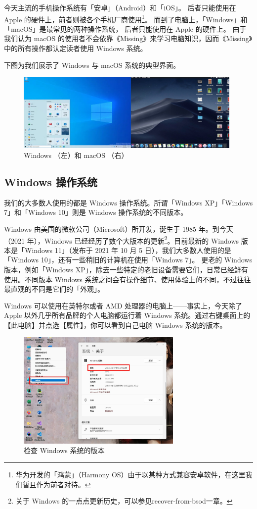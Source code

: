 今天主流的手机操作系统有「安卓」（Android）和「iOS」。
后者只能使用在 Apple 的硬件上，前者则被各个手机厂商使用\footnote{华为开发的「鸿蒙」（Harmony OS）由于以某种方式兼容安卓软件，在这里我们暂且作为前者对待。}。
而到了电脑上，「Windows」和「macOS」是最常见的两种操作系统，
后者只能使用在 Apple 的硬件上。
由于我们认为 macOS 的使用者不会依靠《Missing》来学习电脑知识，因而《Missing》中的所有操作都认定读者使用 Windows 系统。

下图为我们展示了 Windows 与 macOS 系统的典型界面。

\begin{figure}[htb!]
  \centering
  \includegraphics[width=11cm]{assets/Windows_and_macOS.jpg}
  \caption{Windows （左）和 macOS （右）}
  \label{win-and-mac}
\end{figure}

\subsection{Windows 操作系统}

我们的大多数人使用的都是 Windows 操作系统。所谓「Windows XP」「Windows 7」和「Windows 10」则是 Windows 操作系统的不同版本。

Windows 由美国的微软公司（Microsoft）所开发，诞生于 1985 年。到今天（2021 年），Windows 已经经历了数个大版本的更新\footnote{关于 Windows 的一点点更新历史，可以参见\refname{recover-from-bsod}一章。}。目前最新的 Windows 版本是「Windows 11」（发布于 2021 年 10 月 5 日），我们大多数人使用的是「Windows 10」，还有一些稍旧的计算机在使用「Windows 7」。
更老的 Windows 版本，例如「Windows XP」，除去一些特定的老旧设备需要它们，日常已经鲜有使用。不同版本 Windows 系统之间会有操作细节、使用体验上的不同，不过往往最直观的不同是它们的「外观」。

Windows 可以使用在英特尔或者 AMD 处理器的电脑上——事实上，今天除了 Apple 以外几乎所有品牌的个人电脑都运行着 Windows 系统。通过右键桌面上的【此电脑】并点选【属性】，你可以看到自己电脑 Windows 系统的版本。

\begin{figure}[H]
  \centering
  \includegraphics[width=8cm]{assets/Check_Windows_version.jpg}
  \caption{检查 Windows 系统的版本}
  \label{check-windows-version}
\end{figure}

